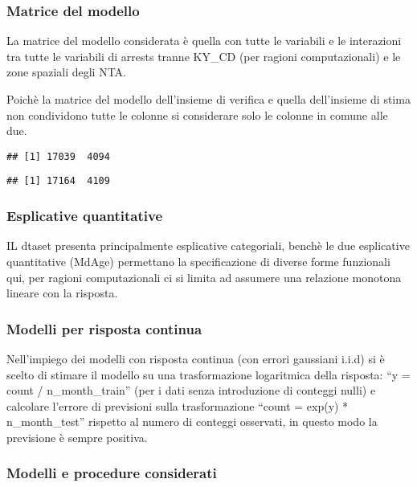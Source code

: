 \documentclass[
  ,
]{article}
\begin{document}
\hypertarget{matrice-del-modello}{%
\subsubsection{Matrice del modello}\label{matrice-del-modello}}

La matrice del modello considerata è quella con tutte le variabili e le interazioni tra tutte le variabili di arrests tranne KY\_CD (per ragioni computazionali) e le zone spaziali degli NTA.

Poichè la matrice del modello dell'insieme di verifica e quella dell'insieme di stima non condividono tutte le colonne si considerare solo le colonne in comune alle due.

\begin{verbatim}
## [1] 17039  4094
\end{verbatim}

\begin{verbatim}
## [1] 17164  4109
\end{verbatim}

\hypertarget{esplicative-quantitative}{%
\subsubsection{Esplicative quantitative}\label{esplicative-quantitative}}

IL dtaset presenta principalmente esplicative categoriali, benchè le due esplicative quantitative (MdAge) permettano la specificazione di diverse forme funzionali qui, per ragioni computazionali ci si limita ad assumere una relazione monotona lineare con la risposta.

\hypertarget{modelli-per-risposta-continua}{%
\subsubsection{Modelli per risposta continua}\label{modelli-per-risposta-continua}}

Nell'impiego dei modelli con risposta continua (con errori gaussiani i.i.d) si è scelto di stimare il modello su una trasformazione logaritmica della risposta: ``y = count / n\_month\_train'' (per i dati senza introduzione di conteggi nulli) e calcolare l'errore di previsioni sulla trasformazione ``count = exp(y) * n\_month\_test'' rispetto al numero di conteggi osservati, in questo modo la previsione è sempre positiva.

\hypertarget{modelli-e-procedure-considerati}{%
\subsubsection{Modelli e procedure considerati}\label{modelli-e-procedure-considerati}}
\end{document}
